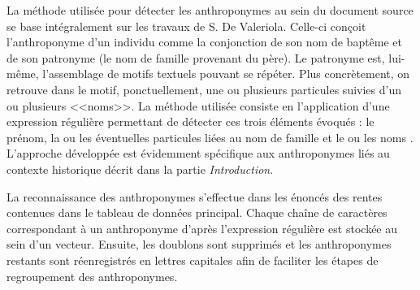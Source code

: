 La méthode utilisée pour détecter les anthroponymes au sein du document source se base intégralement sur les travaux de S. De Valeriola. Celle-ci conçoit l'anthroponyme d'un individu comme la conjonction de son nom de baptême et de son patronyme (le nom de famille provenant du père).
Le patronyme est, lui-même, l'assemblage de motifs textuels pouvant se répéter.
Plus concrètement, on retrouve dans le motif, ponctuellement,  une ou plusieurs particules  suivies d'un ou plusieurs <<noms>>. La méthode  utilisée consiste en l'application d'une expression régulière permettant de détecter ces trois éléments évoqués : le prénom, la ou les éventuelles particules liées au nom de famille et le ou les noms \parencite{de_valeriola_lordinateur_2021}. L'approche développée est évidemment spécifique aux anthroponymes liés au contexte historique décrit dans la partie \textit{Introduction}.

La reconnaissance des anthroponymes s'effectue dans les énoncés des rentes contenues dans le tableau de données principal. Chaque chaîne de caractères correspondant à un anthroponyme d'après l'expression régulière est stockée au sein d'un vecteur. Ensuite, les doublons sont supprimés et les anthroponymes restants sont réenregistrés en lettres capitales afin de faciliter les étapes de regroupement des anthroponymes.


